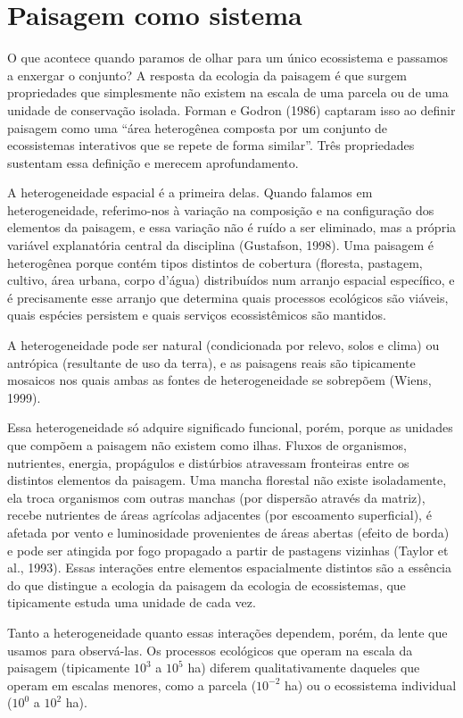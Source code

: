\documentclass[
  portuguese,
  11pt,
  a4paper,
  open=any]{scrbook}
\begin{document}
\section{Paisagem como sistema}\label{paisagem-como-sistema}

O que acontece quando paramos de olhar para um único ecossistema e
passamos a enxergar o conjunto? A resposta da ecologia da paisagem é que
surgem propriedades que simplesmente não existem na escala de uma
parcela ou de uma unidade de conservação isolada. Forman e Godron (1986)
captaram isso ao definir paisagem como uma ``área heterogênea composta
por um conjunto de ecossistemas interativos que se repete de forma
similar''. Três propriedades sustentam essa definição e merecem
aprofundamento.

A heterogeneidade espacial é a primeira delas. Quando falamos em
heterogeneidade, referimo-nos à variação na composição e na configuração
dos elementos da paisagem, e essa variação não é ruído a ser eliminado,
mas a própria variável explanatória central da disciplina (Gustafson,
1998). Uma paisagem é heterogênea porque contém tipos distintos de
cobertura (floresta, pastagem, cultivo, área urbana, corpo d'água)
distribuídos num arranjo espacial específico, e é precisamente esse
arranjo que determina quais processos ecológicos são viáveis, quais
espécies persistem e quais serviços ecossistêmicos são mantidos.

A heterogeneidade pode ser natural (condicionada por relevo, solos e
clima) ou antrópica (resultante de uso da terra), e as paisagens reais
são tipicamente mosaicos nos quais ambas as fontes de heterogeneidade se
sobrepõem (Wiens, 1999).

Essa heterogeneidade só adquire significado funcional, porém, porque as
unidades que compõem a paisagem não existem como ilhas. Fluxos de
organismos, nutrientes, energia, propágulos e distúrbios atravessam
fronteiras entre os distintos elementos da paisagem. Uma mancha
florestal não existe isoladamente, ela troca organismos com outras
manchas (por dispersão através da matriz), recebe nutrientes de áreas
agrícolas adjacentes (por escoamento superficial), é afetada por vento e
luminosidade provenientes de áreas abertas (efeito de borda) e pode ser
atingida por fogo propagado a partir de pastagens vizinhas (Taylor et
al., 1993). Essas interações entre elementos espacialmente distintos são
a essência do que distingue a ecologia da paisagem da ecologia de
ecossistemas, que tipicamente estuda uma unidade de cada vez.

Tanto a heterogeneidade quanto essas interações dependem, porém, da
lente que usamos para observá-las. Os processos ecológicos que operam na
escala da paisagem (tipicamente \(10^3\) a \(10^5\) ha) diferem
qualitativamente daqueles que operam em escalas menores, como a parcela
(\(10^{-2}\) ha) ou o ecossistema individual (\(10^0\) a \(10^2\) ha).
\end{document}
